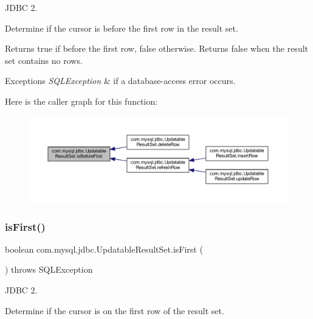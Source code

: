 J\+D\+BC 2.

Determine if the cursor is before the first row in the result set. 

\begin{DoxyReturn}{Returns}
true if before the first row, false otherwise. Returns false when the result set contains no rows.
\end{DoxyReturn}

\begin{DoxyExceptions}{Exceptions}
{\em S\+Q\+L\+Exception} & if a database-\/access error occurs. \\
\hline
\end{DoxyExceptions}
Here is the caller graph for this function\+:
\nopagebreak
\begin{figure}[H]
\begin{center}
\leavevmode
\includegraphics[width=350pt]{classcom_1_1mysql_1_1jdbc_1_1_updatable_result_set_acfe073e7f4e48053b2d5c7fe990fb4d4_icgraph}
\end{center}
\end{figure}
\mbox{\label{classcom_1_1mysql_1_1jdbc_1_1_updatable_result_set_affb11700e1bbd19c5437135ac1b3b8f7}} 
\subsubsection{\texorpdfstring{is\+First()}{isFirst()}}
{\footnotesize\ttfamily boolean com.\+mysql.\+jdbc.\+Updatable\+Result\+Set.\+is\+First (\begin{DoxyParamCaption}{ }\end{DoxyParamCaption}) throws S\+Q\+L\+Exception}

J\+D\+BC 2.

Determine if the cursor is on the first row of the result set. 

